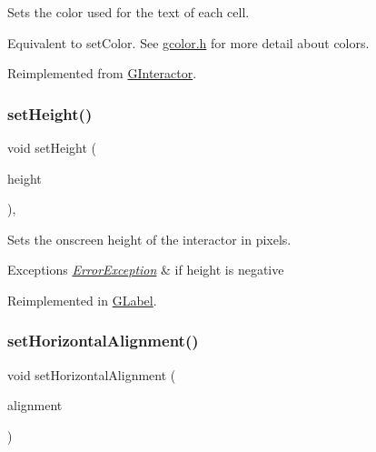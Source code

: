 Sets the color used for the text of each cell. 

Equivalent to set\+Color. See \mbox{\hyperlink{gcolor_8h_source}{gcolor.\+h}} for more detail about colors. 

Reimplemented from \mbox{\hyperlink{classGInteractor_af59209aeadea6dfc6d97a2d8531f50e1}{G\+Interactor}}.

\mbox{\label{classGInteractor_a9e280bfc4544dfaf8e4376c4e1a74357}} 
\subsubsection{\texorpdfstring{set\+Height()}{setHeight()}}
{\footnotesize\ttfamily void set\+Height (\begin{DoxyParamCaption}\item[{double}]{height }\end{DoxyParamCaption})\hspace{0.3cm}{\ttfamily [virtual]}, {\ttfamily [inherited]}}



Sets the onscreen height of the interactor in pixels. 


\begin{DoxyExceptions}{Exceptions}
{\em \mbox{\hyperlink{classErrorException}{Error\+Exception}}} & if height is negative \\
\hline
\end{DoxyExceptions}


Reimplemented in \mbox{\hyperlink{classGLabel_a8a1f6693796b536d1ace7ce0ff66afee}{G\+Label}}.

\mbox{\label{classGTable_a04e6ce745dd0f9708f14dedc68ec8b18}} 
\subsubsection{\texorpdfstring{set\+Horizontal\+Alignment()}{setHorizontalAlignment()}}
{\footnotesize\ttfamily void set\+Horizontal\+Alignment (\begin{DoxyParamCaption}\item[{Horizontal\+Alignment}]{alignment }\end{DoxyParamCaption})\hspace{0.3cm}{\ttfamily [virtual]}}



